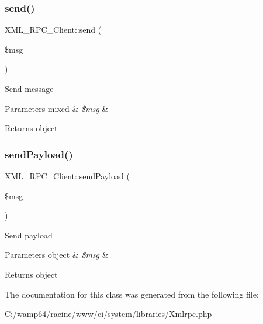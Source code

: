 \subsubsection{\texorpdfstring{send()}{send()}}
{\footnotesize\ttfamily X\+M\+L\+\_\+\+R\+P\+C\+\_\+\+Client\+::send (\begin{DoxyParamCaption}\item[{}]{\$msg }\end{DoxyParamCaption})}

Send message


\begin{DoxyParams}[1]{Parameters}
mixed & {\em \$msg} & \\
\hline
\end{DoxyParams}
\begin{DoxyReturn}{Returns}
object 
\end{DoxyReturn}
\mbox{\label{class_x_m_l___r_p_c___client_ae3dbeba0ca06e54dfdc7895a84636f98}} 
\subsubsection{\texorpdfstring{send\+Payload()}{sendPayload()}}
{\footnotesize\ttfamily X\+M\+L\+\_\+\+R\+P\+C\+\_\+\+Client\+::send\+Payload (\begin{DoxyParamCaption}\item[{}]{\$msg }\end{DoxyParamCaption})}

Send payload


\begin{DoxyParams}[1]{Parameters}
object & {\em \$msg} & \\
\hline
\end{DoxyParams}
\begin{DoxyReturn}{Returns}
object 
\end{DoxyReturn}


The documentation for this class was generated from the following file\+:\begin{DoxyCompactItemize}
\item 
C\+:/wamp64/racine/www/ci/system/libraries/Xmlrpc.\+php\end{DoxyCompactItemize}
